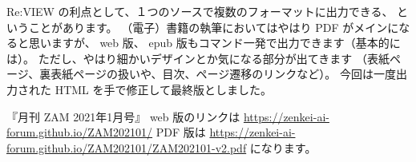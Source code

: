 \documentclass[dvipdfmx,autodetect-engine,10pt,b5paper,papersize,openany,dvipsnames]{jsbook}
\begin{document}
\begin{multicols}{2}
Re:VIEW の利点として、１つのソースで複数のフォーマットに出力できる、
ということがあります。
（電子）書籍の執筆においてはやはり PDF がメインになると思いますが、
web 版、 epub 版もコマンド一発で出力できます（基本的には）。
ただし、やはり細かいデザインとか気になる部分が出てきます
（表紙ページ、裏表紙ページの扱いや、目次、ページ遷移のリンクなど）。
今回は一度出力された HTML を手で修正して最終版としました。

『月刊 ZAM 2021年1月号』 web 版のリンクは
\url{https://zenkei-ai-forum.github.io/ZAM202101/}
PDF 版は \url{https://zenkei-ai-forum.github.io/ZAM202101/ZAM202101-v2.pdf}
になります。

\end{multicols}

\end{document}
